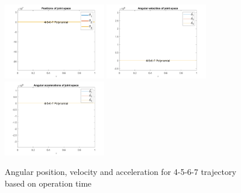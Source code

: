 \documentclass[conference]{IEEEtran}
\begin{document}
\begin{figure}[htbp]
    \centering
    \includegraphics[width=0.4\textwidth]{figures/prob5/theta_i/position_4-5-6-7 Polynomial.png}
    \includegraphics[width=0.4\textwidth]{figures/prob5/theta_i/velocity_4-5-6-7 Polynomial.png}
    \includegraphics[width=0.4\textwidth]{figures/prob5/theta_i/acceleration_4-5-6-7 Polynomial.png}
    \caption{Angular position, velocity and acceleration for 4-5-6-7 trajectory based on operation time}
    \label{fig:res5}
\end{figure}
\end{document}
